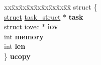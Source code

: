 \begin{DoxyCompactItemize}
\begin{tabbing}
\end{tabbing}\item 
\mbox{\label{structtcp__opt_aed2d5fc1bb8b5feb0c48d9bec20e5073}} 
\begin{tabbing}
xx\=xx\=xx\=xx\=xx\=xx\=xx\=xx\=xx\=\kill
struct \{\\
\>\hyperlink{interfacestruct}{struct} \hyperlink{structtask__struct}{task\_struct} $\ast$ {\bfseries task}\\
\>\hyperlink{interfacestruct}{struct} \hyperlink{structiovec}{iovec} $\ast$ {\bfseries iov}\\
\>int {\bfseries memory}\\
\>int {\bfseries len}\\
\} {\bfseries ucopy}\\


\end{tabbing}
\end{DoxyCompactItemize}
